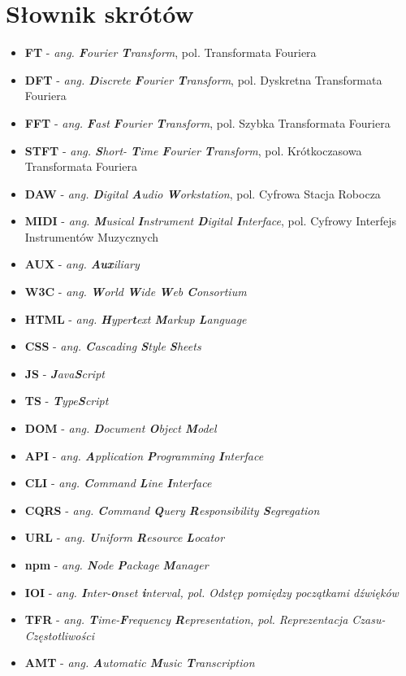 \documentclass[12pt,a4paper,twoside]{mwart}
\begin{document}
\section{Słownik skrótów}
\begin{itemize}
  \item \textbf{FT} - \textit{ang. \textbf{F}ourier \textbf{T}ransform}, pol. Transformata Fouriera
  \item \textbf{DFT} - \textit{ang. \textbf{D}iscrete \textbf{F}ourier \textbf{T}ransform}, pol. Dyskretna Transformata Fouriera
  \item \textbf{FFT} - \textit{ang. \textbf{F}ast \textbf{F}ourier \textbf{T}ransform}, pol. Szybka Transformata Fouriera
  \item \textbf{STFT} - \textit{ang. \textbf{S}hort- \textbf{T}ime \textbf{F}ourier \textbf{T}ransform}, pol. Krótkoczasowa Transformata Fouriera
  \item \textbf{DAW} - \textit{ang. \textbf{D}igital \textbf{A}udio \textbf{W}orkstation}, pol. Cyfrowa Stacja Robocza 
  \item \textbf{MIDI} - \textit{ang. \textbf{M}usical \textbf{I}nstrument \textbf{D}igital \textbf{I}nterface}, pol. Cyfrowy Interfejs Instrumentów Muzycznych
  \item \textbf{AUX} - \textit{ang. \textbf{Aux}iliary}
  \item \textbf{W3C} - \textit{ang. \textbf{W}orld \textbf{W}ide \textbf{W}eb \textbf{C}onsortium}
  \item \textbf{HTML} - \textit{ang. \textbf{H}yper\textbf{t}ext \textbf{M}arkup \textbf{L}anguage}
  \item \textbf{CSS} - \textit{ang.  \textbf{C}ascading \textbf{S}tyle \textbf{S}heets}
  \item \textbf{JS} - \textit{\textbf{J}ava\textbf{S}cript}
  \item \textbf{TS} - \textit{\textbf{T}ype\textbf{S}cript}
  \item \textbf{DOM} - \textit{ang. \textbf{D}ocument \textbf{O}bject \textbf{M}odel}
  \item \textbf{API} - \textit{ang. \textbf{A}pplication \textbf{P}rogramming \textbf{I}nterface}
  \item \textbf{CLI} - \textit{ang. \textbf{C}ommand \textbf{L}ine \textbf{I}nterface}
  \item \textbf{CQRS} - \textit{ang. \textbf{C}ommand \textbf{Q}uery \textbf{R}esponsibility \textbf{S}egregation}
  \item \textbf{URL} - \textit{ang. \textbf{U}niform \textbf{R}esource \textbf{L}ocator }
  \item \textbf{npm} - \textit{ang. \textbf{N}ode \textbf{P}ackage \textbf{M}anager}
  \item \textbf{IOI} - \textit{ang. \textbf{I}nter-\textbf{o}nset \textbf{i}nterval, pol. Odstęp pomiędzy początkami dźwięków}
  \item \textbf{TFR} - \textit{ang. \textbf{T}ime-\textbf{F}requency \textbf{R}epresentation, pol. Reprezentacja Czasu-Częstotliwości}
  \item \textbf{AMT} - \textit{ang. \textbf{A}utomatic \textbf{M}usic \textbf{T}ranscription}
\end{itemize}
\newpage

\printbibliography
\end{document}
